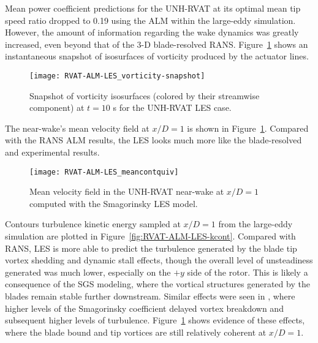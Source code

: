 Mean power coefficient predictions for the UNH-RVAT at its optimal mean tip
speed ratio dropped to 0.19 using the ALM within the large-eddy simulation.
However, the amount of information regarding the wake dynamics was greatly
increased, even beyond that of the 3-D blade-resolved RANS.
Figure~\ref{RVAT-ALM-LES-vorticity} shows an instantaneous snapshot of
isosurfaces of vorticity produced by the actuator lines.

\begin{figure}
    \centering
    
    \texttt{[image: RVAT-ALM-LES\_vorticity-snapshot]}

    \caption{Snapshot of vorticity isosurfaces (colored by their streamwise
        component) at $t=10$ s for the UNH-RVAT LES case.}
    
    \label{RVAT-ALM-LES-vorticity}
\end{figure}

The near-wake's mean velocity field at $x/D=1$ is shown in
Figure~\ref{RVAT-ALM-LES-vorticity}. Compared with the RANS ALM results, the LES
looks much more like the blade-resolved and experimental results.

\begin{figure}
    \centering
    
    \texttt{[image: RVAT-ALM-LES\_meancontquiv]}
    
    \caption{Mean velocity field in the UNH-RVAT near-wake at $x/D=1$ computed
        with the Smagorinsky LES model.}
    
    \label{fig:RVAT-ALM-LES-meancontquiv}
\end{figure}

Contours turbulence kinetic energy sampled at $x/D=1$ from the large-eddy
simulation are plotted in Figure~\ref{fig:RVAT-ALM-LES-kcont}. Compared with
RANS, LES is more able to predict the turbulence generated by the blade tip
vortex shedding and dynamic stall effects, though the overall level of
unsteadiness generated was much lower, especially on the $+y$ side of the rotor.
This is likely a consequence of the SGS modeling, where the vortical structures
generated by the blades remain stable further downstream. Similar effects were
seen in \cite{Martinez-Tossas2015a, Shamsoddin2014}, where higher levels of the
Smagorinsky coefficient delayed vortex breakdown and subsequent higher levels of
turbulence. Figure~\ref{RVAT-ALM-LES-vorticity} shows evidence of these effects,
where the blade bound and tip vortices are still relatively coherent at $x/D=1$.

